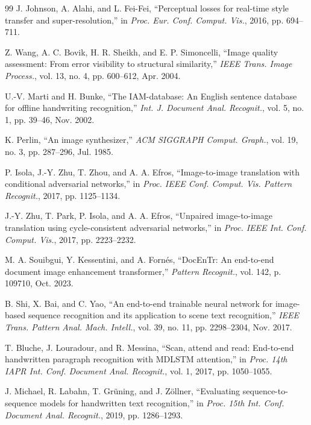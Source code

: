 \documentclass[journal]{IEEEtran}
\begin{document}
\begin{thebibliography}{99}
J. Johnson, A. Alahi, and L. Fei-Fei, ``Perceptual losses for real-time style transfer and super-resolution,'' in \textit{Proc. Eur. Conf. Comput. Vis.}, 2016, pp. 694--711.

Z. Wang, A. C. Bovik, H. R. Sheikh, and E. P. Simoncelli, ``Image quality assessment: From error visibility to structural similarity,'' \textit{IEEE Trans. Image Process.}, vol. 13, no. 4, pp. 600--612, Apr. 2004.

U.-V. Marti and H. Bunke, ``The IAM-database: An English sentence database for offline handwriting recognition,'' \textit{Int. J. Document Anal. Recognit.}, vol. 5, no. 1, pp. 39--46, Nov. 2002.

K. Perlin, ``An image synthesizer,'' \textit{ACM SIGGRAPH Comput. Graph.}, vol. 19, no. 3, pp. 287--296, Jul. 1985.

P. Isola, J.-Y. Zhu, T. Zhou, and A. A. Efros, ``Image-to-image translation with conditional adversarial networks,'' in \textit{Proc. IEEE Conf. Comput. Vis. Pattern Recognit.}, 2017, pp. 1125--1134.

J.-Y. Zhu, T. Park, P. Isola, and A. A. Efros, ``Unpaired image-to-image translation using cycle-consistent adversarial networks,'' in \textit{Proc. IEEE Int. Conf. Comput. Vis.}, 2017, pp. 2223--2232.

M. A. Souibgui, Y. Kessentini, and A. Fornés, ``DocEnTr: An end-to-end document image enhancement transformer,'' \textit{Pattern Recognit.}, vol. 142, p. 109710, Oct. 2023.

B. Shi, X. Bai, and C. Yao, ``An end-to-end trainable neural network for image-based sequence recognition and its application to scene text recognition,'' \textit{IEEE Trans. Pattern Anal. Mach. Intell.}, vol. 39, no. 11, pp. 2298--2304, Nov. 2017.

T. Bluche, J. Louradour, and R. Messina, ``Scan, attend and read: End-to-end handwritten paragraph recognition with MDLSTM attention,'' in \textit{Proc. 14th IAPR Int. Conf. Document Anal. Recognit.}, vol. 1, 2017, pp. 1050--1055.

J. Michael, R. Labahn, T. Grüning, and J. Zöllner, ``Evaluating sequence-to-sequence models for handwritten text recognition,'' in \textit{Proc. 15th Int. Conf. Document Anal. Recognit.}, 2019, pp. 1286--1293.


\end{thebibliography}
\end{document}
